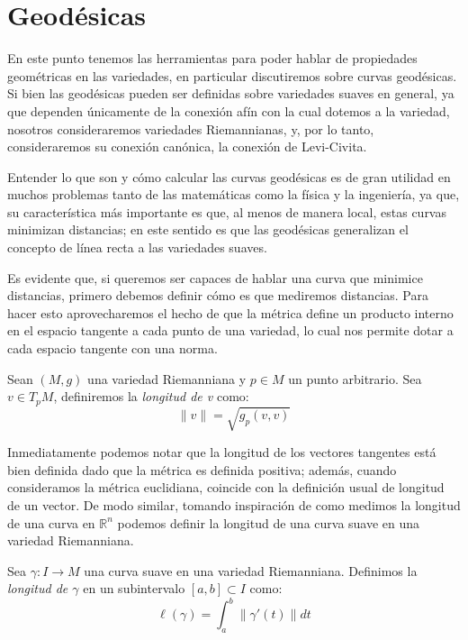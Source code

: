 \section{Geodésicas}\label{Sección: Geodésicas}
En este punto tenemos las herramientas para poder hablar de propiedades geométricas en las variedades, en particular discutiremos sobre curvas geodésicas. Si bien las geodésicas pueden ser definidas sobre variedades suaves en general, ya que dependen únicamente de la conexión afín con la cual dotemos a la variedad, nosotros consideraremos variedades Riemannianas, y, por lo tanto, consideraremos su conexión canónica, la conexión de Levi-Civita.

Entender lo que son y cómo calcular las curvas geodésicas es de gran utilidad en muchos problemas tanto de las matemáticas como la física y la ingeniería, ya que, su característica más importante es que, al menos de manera local, estas curvas minimizan distancias; en este sentido es que las geodésicas generalizan el concepto de línea recta a las variedades suaves.

Es evidente que, si queremos ser capaces de hablar una curva que minimice distancias, primero debemos definir cómo es que mediremos distancias. Para hacer esto aprovecharemos el hecho de que la métrica define un producto interno en el espacio tangente a cada punto de una variedad, lo cual nos permite dotar a cada espacio tangente con una norma.

\begin{definition}
Sean $(M,g)$ una variedad Riemanniana y $p \in M$ un punto arbitrario. Sea $v \in T_{p}M$, definiremos la \textit{longitud de v} como:
\[
	\|v\| = \sqrt{g_{p}(v,v)}
\]
\end{definition}
Inmediatamente podemos notar que la longitud de los vectores tangentes está bien definida dado que la métrica es definida positiva; además, cuando consideramos la métrica euclidiana, coincide con la definición usual de longitud de un vector. De modo similar, tomando inspiración de como medimos la longitud de una curva en $\mathbb{R}^{n}$ podemos definir la longitud de una curva suave en una variedad Riemanniana.
\begin{definition}
	Sea $\gamma: I \to M$ una curva suave en una variedad Riemanniana. Definimos la \textit{longitud de $\gamma$} en un subintervalo $[a,b] \subset I$ como:
	\[
		\ell(\gamma) = \int_{a}^{b} \|\gamma'(t)\| dt
	\]
\end{definition}

